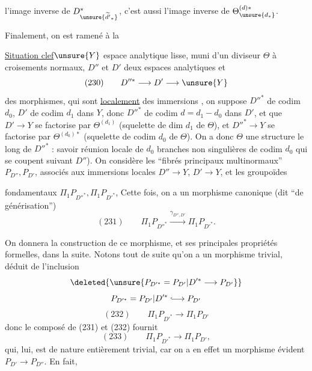  l'image inverse de $D^{*}_{\unsure{\widetilde{d'}_*}}$, c'est aussi l'image inverse de $\Theta^{(d)*}_{\unsure{d_*}}$.


Finalement, on est ramené à la

\uline{Situation clef}\quad $\unsure{Y}$ espace analytique lisse, muni d'un diviseur $\Theta$ à croisements normaux, $D''$ et $D'$ deux espaces analytiques  et
\[
(230)\qquad D''^{*}\longrightarrow D'\longrightarrow \unsure{Y}
\]
des morphismes, qui sont \uline{localement} des immersions , on suppose $D''^{*}$ de codim $d_0$, $D'$ de codim $d_1$ dans $Y$, donc $D''^{*}$ de codim $d=d_1-d_0$ dans $D'$, et que $D'\to Y$ se factorise par $\Theta^{(d_1)}$ (squelette de dim $d_1$ de $\Theta$),  et $D''^{*}\to Y$ se factorise par $\Theta^{(d_0)*}$ (squelette  de codim $d_0$ de $\Theta$).  On a donc $\Theta$ une structure  le long de $D''^{*}$ : savoir réunion locale de $d_0$ branches non singulières  de codim $d_0$ qui se coupent suivant $D''$). On considère les ``fibrés principaux multinormaux'' $P_{D''},P_{D'}$, associés aux immersions locales $D''\to Y$, $D'\to Y$, et les groupoïdes


fondamentaux $\Pi_1P_{D''^{*}},\Pi_1P_{D'^{*}}$, Cette fois, on a un morphisme canonique (dit ``de générisation'')
\[
(231)\qquad \boxed{\Pi_1P_{D''^{*}}\xrightarrow{\gamma_{D'',D'}}\Pi_1P_{D'^{*}}}.
\]

On donnera la  construction de ce morphisme, et ses principales propriétés formelles, dans la suite. Notons tout de suite qu'on a un morphisme trivial, déduit de l'inclusion
\[
\deleted{\unsure{P_{D'^{*}}=P_{D'}\vert D'^{*}\longrightarrow P_{D'}}}
\]
\[
P_{D'^{*}}=P_{D'}\vert D'^{*}\lhook\joinrel\longrightarrow P_{D'}
\]
\[
(232)\qquad\Pi_1P_{D'^{*}}\longrightarrow\Pi_1P_{D'}
\]
donc le composé de (231) et (232) fournit
\[
(233)\qquad\Pi_1P_{D'^{*}}\longrightarrow\Pi_1P_{D'},
\]
qui, lui, est de nature entièrement trivial, car on a en effet un morphisme évident $P_{D'}\longrightarrow P_{D''}$. En fait,


